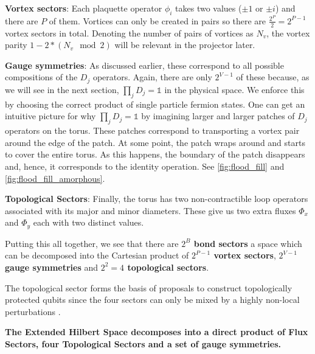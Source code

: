 \textbf{Vortex sectors}: Each plaquette operator \(\phi_i\) takes two values (\(\pm 1\) or \(\pm i\)) and there are \(P\) of them. Vortices can only be created in pairs so there are \(\tfrac{2^P}{2} = 2^{P-1}\) vortex sectors in total. Denoting the number of pairs of vortices as \(N_v\), the vortex parity \(1 - 2*(N_v \mod 2)\) will be relevant in the projector later.

\textbf{Gauge symmetries}: As discussed earlier, these correspond to all possible compositions of the \(D_j\) operators. Again, there are only \(2^{V-1}\) of these because, as we will see in the next section, \(\prod_{j} D_j = \mathbb{1}\) in the physical space. We enforce this by choosing the correct product of single particle fermion states. One can get an intuitive picture for why \(\prod_{j} D_j = \mathbb{1}\) by imagining larger and larger patches of \(D_j\) operators on the torus. These patches correspond to transporting a vortex pair around the edge of the patch. At some point, the patch wraps around and starts to cover the entire torus. As this happens, the boundary of the patch disappears and, hence, it corresponds to the identity operation. See \cref{fig:flood_fill} and \cref{fig:flood_fill_amorphous}.

\textbf{Topological Sectors}: Finally, the torus has two non-contractible loop operators associated with its major and minor diameters. These give us two extra fluxes \(\Phi_x\) and \(\Phi_y\) each with two distinct values.

Putting this all together, we see that there are \textbf{\(2^B\) bond sectors} a space which can be decomposed into the Cartesian product of \textbf{\(2^{P-1}\) vortex sectors}, \textbf{\(2^{V-1}\) gauge symmetries} and \textbf{\(2^2 = 4\) topological sectors}.

The topological sector forms the basis of proposals to construct topologically protected qubits since the four sectors can only be mixed by a highly non-local perturbations \textcite{kitaevFaulttolerantQuantumComputation2003}.

\textbf{The Extended Hilbert Space decomposes into a direct product of Flux Sectors, four Topological Sectors and a set of gauge symmetries.}

